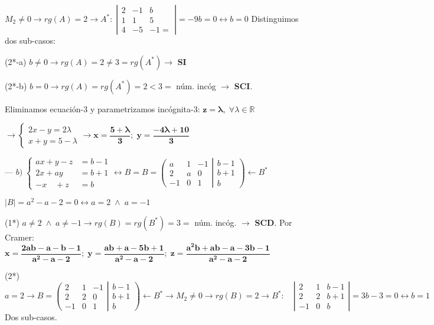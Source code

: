 \begin{proofw}
\noindent $\boxed{M_2}\neq 0 \to rg(A)=2 \longrightarrow A^*: \; \left| \begin{matrix} 2&-1&b\\1&1&5\\4&-5&-1=   \end{matrix} \right|= -9b=0\leftrightarrow b=0$ Distinguimos dos sub-casos:

(2*-a) $b\neq 0 \to rg(A)=2\neq 3=rg(A^*) \to$ \textbf{SI}

(2*-b) $b=0 \to rg(A)=rg(A^*)=2<3=$ núm. incóg $\to$ \textbf{SCI}. 

Eliminamos ecuación-3 y parametrizamos incógnita-3: $\boldsymbol{z=\lambda},\; \forall \lambda\in \mathbb R$

$ \longrightarrow \begin{cases} 2x-y=2\lambda\\x+y=5-\lambda \end{cases} \to \boldsymbol{x=\dfrac{5+\lambda}{3}; \; y=\dfrac{-4\lambda+10}{3}}$


\noindent ---  $b)\; \begin{cases} ax+y-z&=b-1\\2x+ay&=b+1\\-x\quad +z&=b \end{cases} \leftrightarrow B= 
B=\left( \begin{matrix} a&1&-1\\2&a&0\\-1&0&1 \end{matrix} \right| \left. \begin{matrix} b-1\\b+1\\b \end{matrix} \right)
\leftarrow B^* $

\noindent $|B|=a^2-a-2=0\leftrightarrow a=2 \; \wedge \; a=-1$

\noindent (1*) $ a\neq 2 \; \wedge \; a\neq -1 \to rg(B)=rg(B^*)=3=$ núm. incóg. $\to$ \textbf{SCD}. Por Cramer: \scriptsize{$\boldsymbol{x=\dfrac{2ab-a-b-1}{a^2-a-2}; \; y=\dfrac{ab+a-5b+1}{a^2-a-2}; \; z=\dfrac{a^2b+ab-a-3b-1}{a^2-a-2}}$}



\noindent  \normalsize{(2*) } $a=2 \longrightarrow  B=\left( \begin{matrix} \boxed{2}&\boxed{1}&-1\\\boxed{2}&\boxed{2}&0\\-1&0&1 \end{matrix} \right| \left. \begin{matrix} b-1\\b+1\\b \end{matrix} \right)
\leftarrow B^* \to \boxed{M_2}\neq 0 \to rg(B)=2 \longrightarrow B^*:\quad 
\left| \begin{matrix} 2&1&b-1\\2&2&b+1\\-1&0&b \end{matrix} \right|= 3b-3=0\leftrightarrow b=1$ Dos sub-casos.


\end{proofw}
